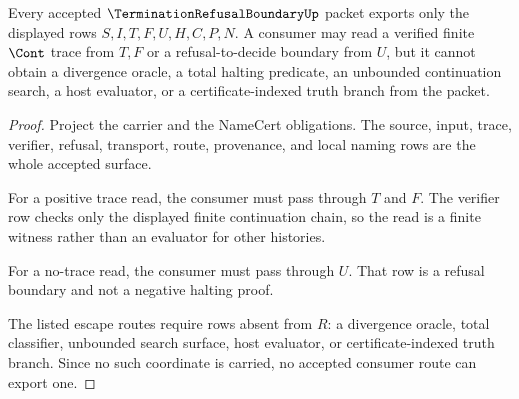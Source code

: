 \begin{theorem}
\label{thm:termination-refusal-boundary-nonescape}
Every accepted $\TerminationRefusalBoundaryUp$ packet exports only the displayed rows $S,I,T,F,U,H,C,P,N$. A consumer may read a verified finite $\Cont$ trace from $T,F$ or a refusal-to-decide boundary from $U$, but it cannot obtain a divergence oracle, a total halting predicate, an unbounded continuation search, a host evaluator, or a certificate-indexed truth branch from the packet.
\end{theorem}
\begin{proof}
Project the carrier and the NameCert obligations. The source, input, trace, verifier, refusal, transport, route, provenance, and local naming rows are the whole accepted surface.

For a positive trace read, the consumer must pass through $T$ and $F$. The verifier row checks only the displayed finite continuation chain, so the read is a finite witness rather than an evaluator for other histories.

For a no-trace read, the consumer must pass through $U$. That row is a refusal boundary and not a negative halting proof.

The listed escape routes require rows absent from $R$: a divergence oracle, total classifier, unbounded search surface, host evaluator, or certificate-indexed truth branch. Since no such coordinate is carried, no accepted consumer route can export one.
\end{proof}

